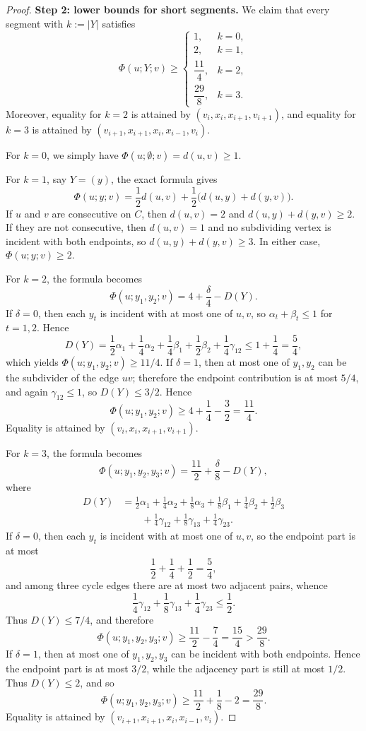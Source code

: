 \begin{proof}
\medskip
\noindent\textbf{Step 2: lower bounds for short segments.}
We claim that every segment with $k:=|Y|$ satisfies
\[
\Phi(u;Y;v)\ge
\begin{cases}
1, & k=0,\\[1mm]
2, & k=1,\\[1mm]
\dfrac{11}{4}, & k=2,\\[2mm]
\dfrac{29}{8}, & k=3.
\end{cases}
\]
Moreover, equality for $k=2$ is attained by $(v_i,x_i,x_{i+1},v_{i+1})$, and equality for $k=3$ is attained by $(v_{i+1},x_{i+1},x_i,x_{i-1},v_i)$.

For $k=0$, we simply have $\Phi(u;\emptyset;v)=d(u,v)\ge 1$.

For $k=1$, say $Y=(y)$, the exact formula gives
\[
\Phi(u;y;v)=\frac12 d(u,v)+\frac12\bigl(d(u,y)+d(y,v)\bigr).
\]
If $u$ and $v$ are consecutive on $C$, then $d(u,v)=2$ and $d(u,y)+d(y,v)\ge 2$. If they are not consecutive, then $d(u,v)=1$ and no subdividing vertex is incident with both endpoints, so $d(u,y)+d(y,v)\ge 3$. In either case, $\Phi(u;y;v)\ge 2$.

For $k=2$, the formula becomes
\[
\Phi(u;y_1,y_2;v)=4+\frac\delta4-D(Y).
\]
If $\delta=0$, then each $y_t$ is incident with at most one of $u,v$, so $\alpha_t+\beta_t\le 1$ for $t=1,2$. Hence
\[
D(Y)
=\frac12\alpha_1+\frac14\alpha_2+\frac14\beta_1+\frac12\beta_2+\frac14\gamma_{12}
\le 1+\frac14=\frac54,
\]
which yields $\Phi(u;y_1,y_2;v)\ge 11/4$. If $\delta=1$, then at most one of $y_1,y_2$ can be the subdivider of the edge $uv$; therefore the endpoint contribution is at most $5/4$, and again $\gamma_{12}\le 1$, so $D(Y)\le 3/2$. Hence
\[
\Phi(u;y_1,y_2;v)\ge 4+\frac14-\frac32=\frac{11}{4}.
\]
Equality is attained by $(v_i,x_i,x_{i+1},v_{i+1})$.

For $k=3$, the formula becomes
\[
\Phi(u;y_1,y_2,y_3;v)=\frac{11}{2}+\frac\delta8-D(Y),
\]
where
\begin{align*}
D(Y)
&=\frac12\alpha_1+\frac14\alpha_2+\frac18\alpha_3
+\frac18\beta_1+\frac14\beta_2+\frac12\beta_3 \\
&\qquad +\frac14\gamma_{12}+\frac18\gamma_{13}+\frac14\gamma_{23}.
\end{align*}
If $\delta=0$, then each $y_t$ is incident with at most one of $u,v$, so the endpoint part is at most
\[
\frac12+\frac14+\frac12=\frac54,
\]
and among three cycle edges there are at most two adjacent pairs, whence
\[
\frac14\gamma_{12}+\frac18\gamma_{13}+\frac14\gamma_{23}\le \frac12.
\]
Thus $D(Y)\le 7/4$, and therefore
\[
\Phi(u;y_1,y_2,y_3;v)\ge \frac{11}{2}-\frac74=\frac{15}{4}>\frac{29}{8}.
\]
If $\delta=1$, then at most one of $y_1,y_2,y_3$ can be incident with both endpoints. Hence the endpoint part is at most $3/2$, while the adjacency part is still at most $1/2$. Thus $D(Y)\le 2$, and so
\[
\Phi(u;y_1,y_2,y_3;v)\ge \frac{11}{2}+\frac18-2=\frac{29}{8}.
\]
Equality is attained by $(v_{i+1},x_{i+1},x_i,x_{i-1},v_i)$.


\end{proof}
